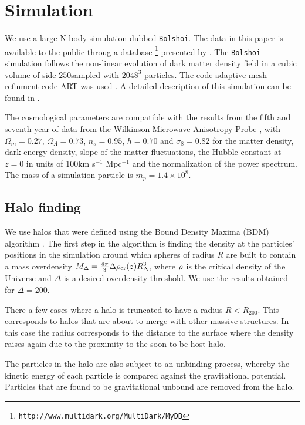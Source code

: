 

   
\section{Simulation}\label{Simulations}

We use a large N-body simulation dubbed \verb"Bolshoi". The data in
this paper is available to the public throug a
database \footnote{\texttt{http://www.multidark.org/MultiDark/MyDB}}
presented by \cite{Riebe:2011gp}. The \verb"Bolshoi" simulation follows 
the non-linear evolution of dark matter density field in a cubic
volume of side $250$\hMpc sampled with $2048^3$ particles. The code
adaptive mesh refinment code ART was used  \citep{Klypin09}. A detailed
description of this simulation can be found in \cite{Klypin:2010qw}.

The cosmological parameters are compatible with the results from the
fifth and seventh year of data from the Wilkinson Microwave Anisotropy
Probe \citep{Komatsu2009,Jarosik2011}, with $\Omega_m=0.27$,
$\Omega_{\Lambda}=0.73$, $n_{s}=0.95$, $h=0.70$ and $\sigma_8=0.82$
for the matter density, dark energy density, slope of the matter
fluctuations, the Hubble constant at $z=0$ in units of 100km s$^{-1}$
Mpc$^{-1}$ and the normalization of the power spectrum. The mass of a
simulation particle is $m_p = 1.4\times 10^{8}$\hMsun. 


\subsection{Halo finding}

We use halos that were defined using the Bound Density Maxima (BDM)
algorithm \citep{KlypinBDM}. The first step in the algorithm is
finding the density at the particles' positions in the simulation
around which spheres of radius $R$ are built to contain a mass
overdensity $M_{\Delta} = \frac{4\pi}{3}\Delta \rho_{\rm
  cr}(z)R_{\Delta}^{3}$, where $\rho_{\rm}$ is the critical density of
the Universe and $\Delta$ is a desired overdensity threshold. We use
the results obtained for $\Delta=200$. 

There a few cases where a halo is truncated to have a radius
$R<R_{200}$. This corresponds to halos that are about to merge with
other massive structures. In this case the radius corresponds to the
distance to the surface where the density raises again due to the
proximity to the soon-to-be host halo.

The particles in the halo are also subject to an unbinding process,
whereby the kinetic energy of each particle is compared against the
gravitational potential. Particles that are found to be gravitational
unbound are removed from the halo.

